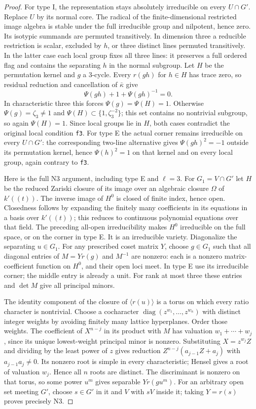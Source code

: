 \begin{proof}
For type I, the representation stays absolutely irreducible on
every $U\cap G'$.  Replace $U$ by its normal core.  The radical
of the finite-dimensional restricted image algebra is stable under
the full irreducible group and nilpotent, hence zero.  Its isotypic
summands are permuted transitively.  In dimension three a reducible
restriction is scalar, excluded by $h$, or three distinct lines
permuted transitively.  In the latter case each local group fixes
all three lines: it preserves a full ordered flag and contains
the separating $h$ in the normal subgroup.  Let $H$ be the permutation
kernel and $g$ a 3-cycle.  Every $r(gh)$ for $h\in H$ has trace zero,
so residual reduction and cancellation of $\bar\kappa$ give
\[
                    \Psi(gh)+1+\Psi(gh)^{-1}=0.
\]
In characteristic three this forces $\Psi(g)=\Psi(H)=1$.
Otherwise $\Psi(g)=\zeta_3\ne1$ and
$\Psi(H)\subset\{1,\zeta_3^{-2}\}$; this set contains no nontrivial
subgroup, so again $\Psi(H)=1$.  Since local groups lie in $H$,
both cases contradict the original local condition \texttt{f3}.
For type E the actual corner remains irreducible on every $U\cap G'$:
the corresponding two-line alternative gives
$\Psi(gh)^2=-1$ outside its permutation kernel, hence $\Psi(h)^2=1$
on that kernel and on every local group, again contrary to \texttt{f3}.

Here is the full N3 argument, including type E and $\ell=3$.
For $G_1=V\cap G'$ let $H$ be the reduced Zariski closure of its
image over an algebraic closure $\Omega$ of $k'((t))$.
The inverse image of $H^0$ is closed of finite index, hence open.
Closedness follows by expanding the finitely many coefficients
in its equations in a basis over $k'((t))$; this reduces to
continuous polynomial equations over that field.
The preceding all-open irreducibility makes $H^0$ irreducible on
the full space, or on the corner in type E.  It is an irreducible
variety.\cite{support-rankthree-torus}
Diagonalize the separating $u\in G_1$.  For any prescribed coset
matrix $Y$, choose $g\in G_1$ such that all diagonal entries of
$M=Yr(g)$ and $M^{-1}$ are nonzero: each is a nonzero
matrix-coefficient function on $H^0$, and their open loci meet.
In type E use its irreducible corner; the middle entry is already
a unit.  For rank at most three these entries and $\det M$ give
all principal minors.

The identity component of the closure of $\langle r(u)\rangle$
is a torus on which every ratio character is nontrivial.  Choose
a cocharacter $\operatorname{diag}(z^{w_1},\ldots,z^{w_n})$ with
distinct integer weights by avoiding finitely many lattice
hyperplanes.\cite{support-rankthree-torus}  Order those weights.
The coefficient of $X^{n-j}$ in its product with $M$ has valuation
$w_1+\cdots+w_j$, since its unique lowest-weight principal minor
is nonzero.  Substituting $X=z^{w_j}Z$ and dividing by the least
power of $z$ gives reduction
$Z^{n-j}(a_{j-1}Z+a_j)$ with $a_{j-1}a_j\ne0$.
Its nonzero root is simple in every characteristic; Hensel gives
a root of valuation $w_j$.  Hence all $n$ roots are distinct.
The discriminant is nonzero on that torus, so some power $u^m$
gives separable $Yr(gu^m)$.  For an arbitrary open set meeting $G'$,
choose $s\in G'$ in it and $V$ with $sV$ inside it; taking $Y=r(s)$
proves precisely N3.


\end{proof}
